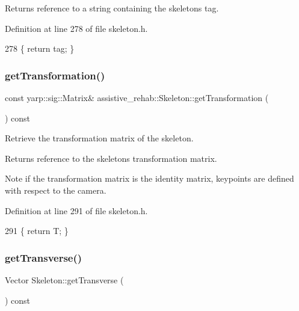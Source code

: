 \begin{DoxyReturn}{Returns}
reference to a string containing the skeleton\textquotesingle{}s tag. 
\end{DoxyReturn}


Definition at line 278 of file skeleton.\+h.


\begin{DoxyCode}
278 \{ \textcolor{keywordflow}{return} tag; \}
\end{DoxyCode}
\mbox{\label{classassistive__rehab_1_1Skeleton_a2bdcc0d686a5a232aa2c07528cf2e647}} 
\subsubsection{\texorpdfstring{get\+Transformation()}{getTransformation()}}
{\footnotesize\ttfamily const yarp\+::sig\+::\+Matrix\& assistive\+\_\+rehab\+::\+Skeleton\+::get\+Transformation (\begin{DoxyParamCaption}{ }\end{DoxyParamCaption}) const\hspace{0.3cm}{\ttfamily [inline]}}



Retrieve the transformation matrix of the skeleton. 

\begin{DoxyReturn}{Returns}
reference to the skeleton\textquotesingle{}s transformation matrix. 
\end{DoxyReturn}
\begin{DoxyNote}{Note}
if the transformation matrix is the identity matrix, keypoints are defined with respect to the camera. 
\end{DoxyNote}


Definition at line 291 of file skeleton.\+h.


\begin{DoxyCode}
291 \{ \textcolor{keywordflow}{return} T; \}
\end{DoxyCode}
\mbox{\label{classassistive__rehab_1_1Skeleton_a35c3cdea575eb474a2cb8e0186011cff}} 
\subsubsection{\texorpdfstring{get\+Transverse()}{getTransverse()}}
{\footnotesize\ttfamily Vector Skeleton\+::get\+Transverse (\begin{DoxyParamCaption}{ }\end{DoxyParamCaption}) const}



